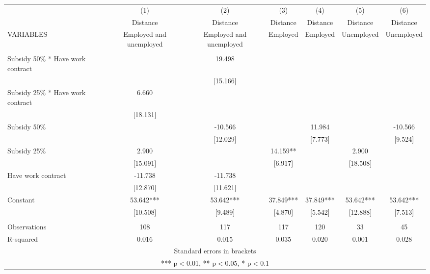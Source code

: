 \documentclass[]{article}
\begin{document}
\begin{tabular}{lcccccc} \hline
 & (1) & (2) & (3) & (4) & (5) & (6) \\
 & Distance & Distance & Distance & Distance & Distance & Distance \\
VARIABLES & Employed and unemployed & Employed and unemployed & Employed & Employed & Unemployed & Unemployed \\ \hline
 &  &  &  &  &  &  \\
Subsidy 50\% * Have work contract &  & 19.498 &  &  &  &  \\
 &  & [15.166] &  &  &  &  \\
Subsidy 25\% * Have work contract & 6.660 &  &  &  &  &  \\
 & [18.131] &  &  &  &  &  \\
Subsidy 50\% &  & -10.566 &  & 11.984 &  & -10.566 \\
 &  & [12.029] &  & [7.773] &  & [9.524] \\
Subsidy 25\% & 2.900 &  & 14.159** &  & 2.900 &  \\
 & [15.091] &  & [6.917] &  & [18.508] &  \\
Have work contract & -11.738 & -11.738 &  &  &  &  \\
 & [12.870] & [11.621] &  &  &  &  \\
Constant & 53.642*** & 53.642*** & 37.849*** & 37.849*** & 53.642*** & 53.642*** \\
 & [10.508] & [9.489] & [4.870] & [5.542] & [12.888] & [7.513] \\
 &  &  &  &  &  &  \\
Observations & 108 & 117 & 117 & 120 & 33 & 45 \\
 R-squared & 0.016 & 0.015 & 0.035 & 0.020 & 0.001 & 0.028 \\ \hline
\multicolumn{7}{c}{ Standard errors in brackets} \\
\multicolumn{7}{c}{ *** p$<$0.01, ** p$<$0.05, * p$<$0.1} \\
\end{tabular}
\end{document}

